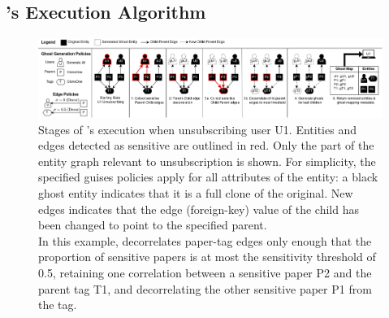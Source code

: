 \iffalse
\subsection{\sys's Execution Algorithm}
\begin{figure}[ht!]
    \centering
    \includegraphics[width=\textwidth]{img/algo}

    \caption{Stages of \sys's execution when unsubscribing user U1. Entities and edges detected as
    sensitive are outlined in red. Only the part of the entity graph relevant to unsubscription is shown.
    For simplicity, the specified guises policies apply for all attributes
    of the entity: a black ghost entity indicates that it is a full clone of the original.
    New edges indicates that the edge (foreign-key) value of the child has been changed to
    point to the specified parent.\\
    In this example, \sys decorrelates paper-tag edges only enough that the proportion of sensitive papers
    is at most the sensitivity threshold of 0.5, retaining one correlation between a sensitive
    paper P2 and the parent tag T1, and decorrelating the other sensitive paper P1 from the tag.}
    \label{fig:algo}
\end{figure}



